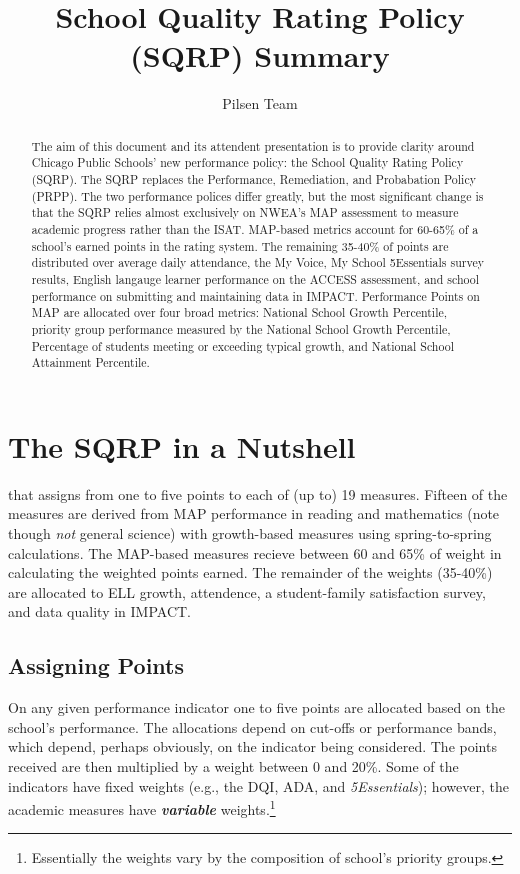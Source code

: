 \documentclass[sfsidenotes, justified]{tufte-handout}\usepackage[]{graphicx}\usepackage[]{color}
\title{School Quality Rating Policy (SQRP) Summary}
\author{Pilsen Team}
\begin{document}
\maketitle
\begin{abstract}
The aim of this document and its attendent presentation is to provide clarity around Chicago Public Schools' new performance policy: the School Quality Rating Policy (SQRP).  The SQRP replaces the Performance, Remediation, and Probabation Policy (PRPP).  The two performance polices differ greatly, but the most significant change is that the SQRP relies almost exclusively on NWEA's MAP assessment to measure academic progress rather than the ISAT. MAP-based metrics account for 60-65\% of a school's earned points in the rating system.  The remaining 35-40\% of points are distributed over average daily attendance, the My Voice, My School 5Essentials survey results, English langauge learner performance on the ACCESS assessment, and school performance on submitting and maintaining data in IMPACT. Performance Points on MAP are allocated over four broad metrics: National School Growth Percentile, priority group performance measured by the National School Growth Percentile, Percentage of students meeting or exceeding typical growth, and National School Attainment Percentile. 
\end{abstract}







\section{The SQRP in a Nutshell}
 that assigns from one to five points to each of (up to) 19 measures. Fifteen of the measures are derived from MAP performance in reading and mathematics (note though \emph{not} general science) with growth-based measures using spring-to-spring calculations. The MAP-based measures recieve between 60 and 65\% of weight in calculating the weighted points earned.  The remainder of the weights (35-40\%) are allocated to ELL growth, attendence, a student-family satisfaction survey, and data quality in IMPACT.  

\subsection{Assigning Points}
On any given performance indicator one to five points are allocated based on the school's performance.  The allocations depend on cut-offs or performance bands, which depend, perhaps obviously, on the indicator being considered. The points received are then multiplied by a weight between 0 and 20\%. Some of the indicators have fixed weights (e.g., the DQI, ADA, and \emph{5Essentials}); however, the academic measures have \emph{\textbf{variable}} weights.\footnote{Essentially the weights vary by the composition of school's priority groups.} 
\end{document}
